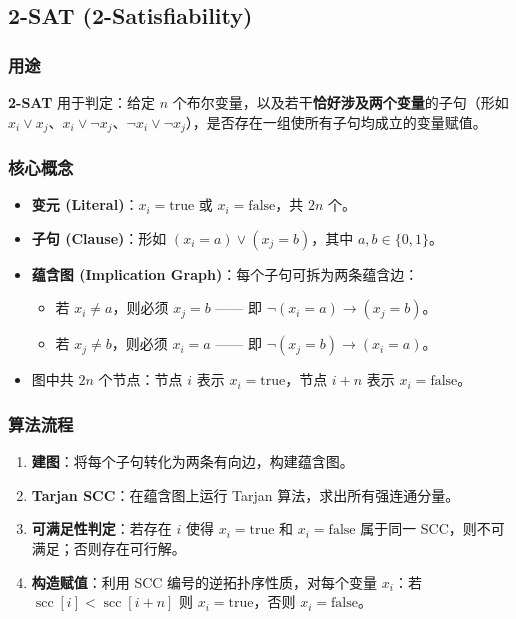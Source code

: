 

\subsection{2-SAT (2-Satisfiability)}

\subsubsection{用途}

\textbf{2-SAT} 用于判定：给定 $n$ 个布尔变量，以及若干\textbf{恰好涉及两个变量}的子句（形如 $x_i \lor x_j$、$x_i \lor \lnot x_j$、$\lnot x_i \lor \lnot x_j$），是否存在一组使所有子句均成立的变量赋值。

\subsubsection{核心概念}

\begin{itemize}
  \item \textbf{变元 (Literal)}：$x_i = \text{true}$ 或 $x_i = \text{false}$，共 $2n$ 个。
  \item \textbf{子句 (Clause)}：形如 $(x_i = a) \lor (x_j = b)$，其中 $a, b \in \{0, 1\}$。
  \item \textbf{蕴含图 (Implication Graph)}：每个子句可拆为两条蕴含边：
    \begin{itemize}
      \item 若 $x_i \neq a$，则必须 $x_j = b$  —— 即 $\lnot(x_i = a) \to (x_j = b)$。
      \item 若 $x_j \neq b$，则必须 $x_i = a$  —— 即 $\lnot(x_j = b) \to (x_i = a)$。
    \end{itemize}
  \item 图中共 $2n$ 个节点：节点 $i$ 表示 $x_i = \text{true}$，节点 $i + n$ 表示 $x_i = \text{false}$。
\end{itemize}

\subsubsection{算法流程}

\begin{enumerate}
  \item \textbf{建图}：将每个子句转化为两条有向边，构建蕴含图。
  \item \textbf{Tarjan SCC}：在蕴含图上运行 Tarjan 算法，求出所有强连通分量。
  \item \textbf{可满足性判定}：若存在 $i$ 使得 $x_i = \text{true}$ 和 $x_i = \text{false}$ 属于同一 SCC，则不可满足；否则存在可行解。
  \item \textbf{构造赋值}：利用 SCC 编号的逆拓扑序性质，对每个变量 $x_i$：若 $\operatorname{scc}[i] < \operatorname{scc}[i + n]$ 则 $x_i = \text{true}$，否则 $x_i = \text{false}$。
\end{enumerate}

